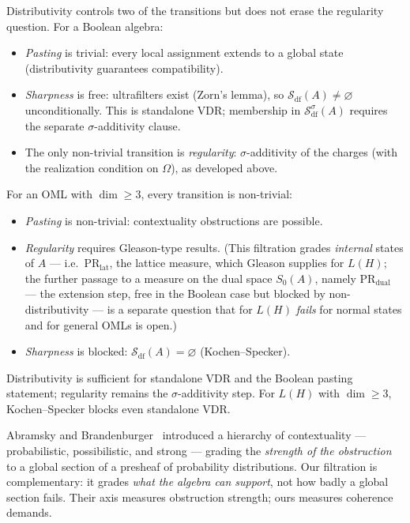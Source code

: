 \noindent Distributivity controls two of the transitions but does not erase
the regularity question.  For a Boolean algebra:
\begin{itemize}
  \item \emph{Pasting} is trivial: every local assignment extends
    to a global state (distributivity guarantees compatibility).
  \item \emph{Sharpness} is free: ultrafilters exist (Zorn's lemma),
    so $\mathcal{S}_{\mathrm{df}}(A) \neq \varnothing$
    unconditionally.  This is standalone VDR; membership in
    $\mathcal{S}_{\mathrm{df}}^\sigma(A)$ requires the separate
    $\sigma$-additivity clause.
  \item The only non-trivial transition is \emph{regularity}:
    $\sigma$-additivity of the charges (with the realization condition
    on $\Omega$), as developed above.
\end{itemize}
For an OML with $\dim \geq 3$, every transition is non-trivial:
\begin{itemize}
  \item \emph{Pasting} is non-trivial: contextuality obstructions
    are possible.
  \item \emph{Regularity} requires Gleason-type results. (This
    filtration grades \emph{internal} states of $A$ --- i.e.\
    $\text{PR}_{\text{lat}}$, the lattice measure, which Gleason
    supplies for $L(H)$; the further passage to a measure on the dual
    space $S_0(A)$, namely $\text{PR}_{\text{dual}}$ --- the extension
    step, free in the Boolean case but blocked by non-distributivity ---
    is a separate question that for $L(H)$ \emph{fails} for normal
    states and for general OMLs is open.)
  \item \emph{Sharpness} is blocked: $\mathcal{S}_{\mathrm{df}}(A)
    = \varnothing$ (Kochen--Specker).
\end{itemize}

\noindent Distributivity is sufficient for standalone VDR and the Boolean
pasting statement; regularity remains the $\sigma$-additivity step.  For
$L(H)$ with $\dim \geq 3$, Kochen--Specker blocks even standalone VDR.

\begin{remark}
Abramsky and Brandenburger~\cite{AbramskyBrandenburger2011}
introduced a hierarchy of contextuality --- probabilistic,
possibilistic, and strong --- grading the \emph{strength of the
obstruction} to a global section of a presheaf of probability
distributions.  Our filtration is complementary: it grades
\emph{what the algebra can support}, not how badly a global section
fails.  Their axis measures obstruction strength; ours measures
coherence demands.
\end{remark}

